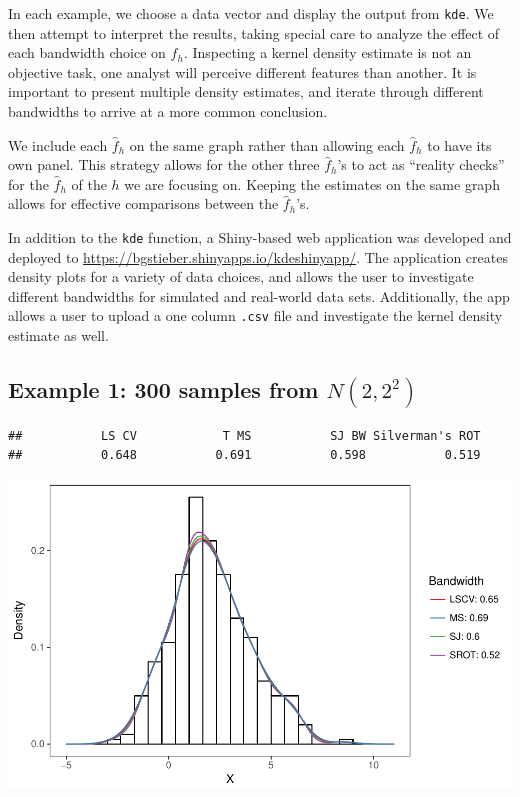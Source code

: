 \documentclass[]{article}
\begin{document}
In each example, we choose a data vector and display the output from
\texttt{kde}. We then attempt to interpret the results, taking special
care to analyze the effect of each bandwidth choice on \(\hat{f}_h\).
Inspecting a kernel density estimate is not an objective task, one
analyst will perceive different features than another. It is important
to present multiple density estimates, and iterate through different
bandwidths to arrive at a more common conclusion.

We include each \(\hat f_h\) on the same graph rather than allowing each
\(\hat f_h\) to have its own panel. This strategy allows for the other
three \(\hat f_h\)'s to act as ``reality checks'' for the \(\hat f_h\)
of the \(h\) we are focusing on. Keeping the estimates on the same graph
allows for effective comparisons between the \(\hat f_h\)'s.

In addition to the \texttt{kde} function, a Shiny-based web application
was developed and deployed to
\url{https://bgstieber.shinyapps.io/kdeshinyapp/}. The application
creates density plots for a variety of data choices, and allows the user
to investigate different bandwidths for simulated and real-world data
sets. Additionally, the app allows a user to upload a one column
\texttt{.csv} file and investigate the kernel density estimate as well.

\newpage

\subsection{Example 1: 300 samples from $N(2, 2^2)$}

\begin{verbatim}
##           LS CV            T MS           SJ BW Silverman's ROT 
##           0.648           0.691           0.598           0.519
\end{verbatim}

\begin{center}\includegraphics{FinalReport_files/figure-latex/unnamed-chunk-6-1} \end{center}
\end{document}
